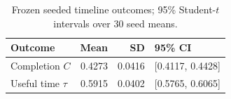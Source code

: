 \begin{table}[t]
\centering
\caption{Frozen seeded timeline outcomes; 95\% Student-$t$ intervals over 30 seed means.}
\label{tab:primary}
\par\smallskip
\small
\begin{tabular}{lrrl}
\toprule
Outcome & Mean & SD & 95\% CI \\
\midrule
Completion $C$ & 0.4273 & 0.0416 & [0.4117, 0.4428] \\
Useful time $\tau$ & 0.5915 & 0.0402 & [0.5765, 0.6065] \\
\bottomrule
\end{tabular}
\end{table}
